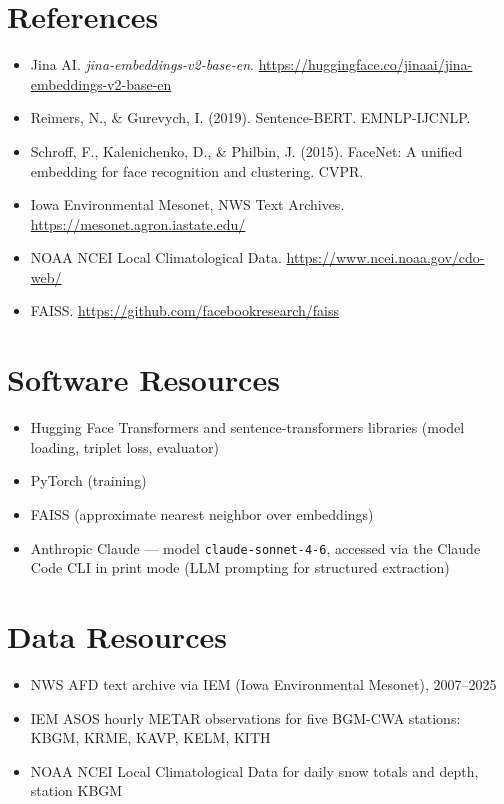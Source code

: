 \documentclass[11pt]{article}
\begin{document}
\section*{References}
\begin{itemize}
  \item Jina AI. \emph{jina-embeddings-v2-base-en}. \url{https://huggingface.co/jinaai/jina-embeddings-v2-base-en}
  \item Reimers, N., \& Gurevych, I. (2019). Sentence-BERT. EMNLP-IJCNLP.
  \item Schroff, F., Kalenichenko, D., \& Philbin, J. (2015). FaceNet: A unified embedding for face recognition and clustering. CVPR.
  \item Iowa Environmental Mesonet, NWS Text Archives. \url{https://mesonet.agron.iastate.edu/}
  \item NOAA NCEI Local Climatological Data. \url{https://www.ncei.noaa.gov/cdo-web/}
  \item FAISS. \url{https://github.com/facebookresearch/faiss}
\end{itemize}

\section*{Software Resources}
\begin{itemize}
  \item Hugging Face Transformers and sentence-transformers libraries (model loading, triplet loss, evaluator)
  \item PyTorch (training)
  \item FAISS (approximate nearest neighbor over embeddings)
  \item Anthropic Claude --- model \texttt{claude-sonnet-4-6}, accessed via the Claude Code CLI in print mode (LLM prompting for structured extraction)
\end{itemize}

\section*{Data Resources}
\begin{itemize}
  \item NWS AFD text archive via IEM (Iowa Environmental Mesonet), 2007--2025
  \item IEM ASOS hourly METAR observations for five BGM-CWA stations: KBGM, KRME, KAVP, KELM, KITH
  \item NOAA NCEI Local Climatological Data for daily snow totals and depth, station KBGM
\end{itemize}
\end{document}
